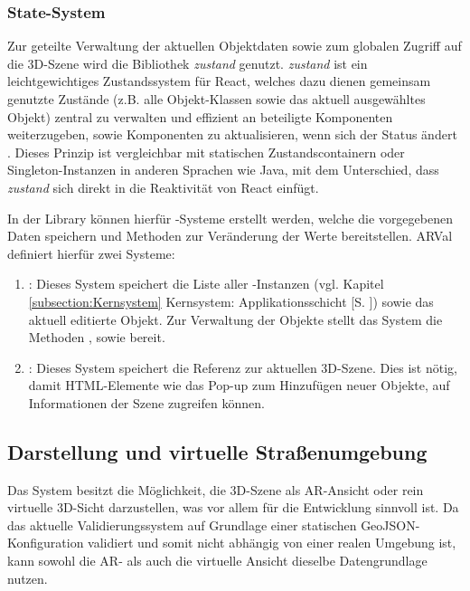 \subsubsection{State-System}

Zur geteilte Verwaltung der aktuellen Objektdaten sowie zum globalen Zugriff auf die 3D-Szene wird die Bibliothek \textit{zustand} genutzt. \textit{zustand} ist ein leichtgewichtiges Zustandssystem für React, welches dazu dienen gemeinsam genutzte Zustände (z.B. alle Objekt-Klassen sowie das aktuell ausgewähltes Objekt) zentral zu verwalten und effizient an beteiligte Komponenten weiterzugeben, sowie Komponenten zu aktualisieren, wenn sich der Status ändert \parencite{poimandresZustand2025}. Dieses Prinzip ist vergleichbar mit statischen Zustandscontainern oder Singleton-Instanzen in anderen Sprachen wie Java, mit dem Unterschied, dass \textit{zustand} sich direkt in die Reaktivität von React einfügt. 

In der Library können hierfür -Systeme erstellt werden, welche die vorgegebenen Daten speichern und Methoden zur Veränderung der Werte bereitstellen. ARVal definiert hierfür zwei Systeme:

\begin{enumerate}
    \item {}: Dieses System speichert die Liste aller -Instanzen (vgl. Kapitel \ref{subsection:Kernsystem} Kernsystem: Applikationsschicht [S. \pageref{subsection:Kernsystem}]) sowie das aktuell editierte Objekt. Zur Verwaltung der Objekte stellt das System die Methoden ,  sowie  bereit.
    \item {}: Dieses System speichert die Referenz zur aktuellen 3D-Szene. Dies ist nötig, damit HTML-Elemente wie das Pop-up zum Hinzufügen neuer Objekte, auf Informationen der Szene zugreifen können.
\end{enumerate}

\subsection{Darstellung und virtuelle Straßenumgebung}\label{subsection:Virtuelle Straßenumgebung}

Das System besitzt die Möglichkeit, die 3D-Szene als AR-Ansicht oder rein virtuelle 3D-Sicht darzustellen, was vor allem für die Entwicklung sinnvoll ist. Da das aktuelle Validierungssystem auf Grundlage einer statischen GeoJSON-Konfiguration validiert und somit nicht abhängig von einer realen Umgebung ist, kann sowohl die AR- als auch die virtuelle Ansicht dieselbe Datengrundlage nutzen.


